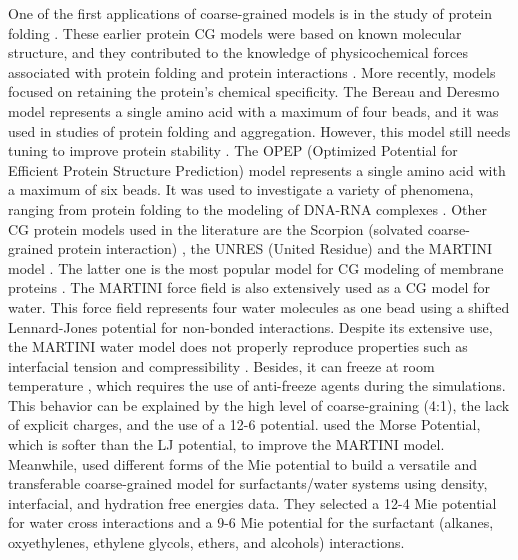 One of the first applications of coarse-grained models is in the study of protein folding \cite{levitt1975,levitt1976}. These earlier protein CG models were based on known molecular structure, and they contributed to the knowledge of physicochemical forces associated with protein folding and protein interactions \cite{koga2001}.  More recently, models focused on retaining the protein's chemical specificity. The Bereau and Deresmo model \cite{bereau2009} represents a single amino acid with a maximum of four beads, and it was used in studies of protein folding and aggregation. However, this model still needs tuning to improve protein stability \cite{bereau2010}. The OPEP (Optimized Potential for Efficient Protein Structure Prediction) model \cite{opep2014,opep2015} represents a single amino acid with a maximum of six beads. It was used to investigate a variety of phenomena, ranging from protein folding to the modeling of DNA-RNA complexes \cite{opep2011,opep2009,opep2014}. Other CG protein models used in the literature are the Scorpion (solvated coarse-grained protein interaction)  \cite{scorpion2013}, the UNRES (United Residue) \cite{unres2014} and the MARTINI model \cite{martini2013}. The latter one is the most popular model for CG modeling of membrane proteins \cite{martini20132}. The MARTINI force field is also extensively used as a CG model for water. This force field represents four water molecules as one bead using a shifted Lennard-Jones potential for non-bonded interactions. Despite its extensive use, the MARTINI water model does not properly reproduce properties such as interfacial tension and compressibility \cite{shinoda2010}. Besides, it can freeze at room temperature \cite{winger2009,martini2007}, which requires the use of anti-freeze agents during the simulations. This behavior can be explained by the high level of coarse-graining (4:1), the lack of explicit charges, and the use of a 12-6 potential.  used the Morse Potential, which is softer than the LJ potential, to improve the MARTINI model. Meanwhile,  used different forms of the Mie potential to build a versatile and transferable coarse-grained model for surfactants/water systems using density, interfacial, and hydration free energies data. They selected a 12-4 Mie potential for water cross interactions and a 9-6 Mie potential for the surfactant (alkanes, oxyethylenes, ethylene glycols, ethers, and alcohols) interactions.

